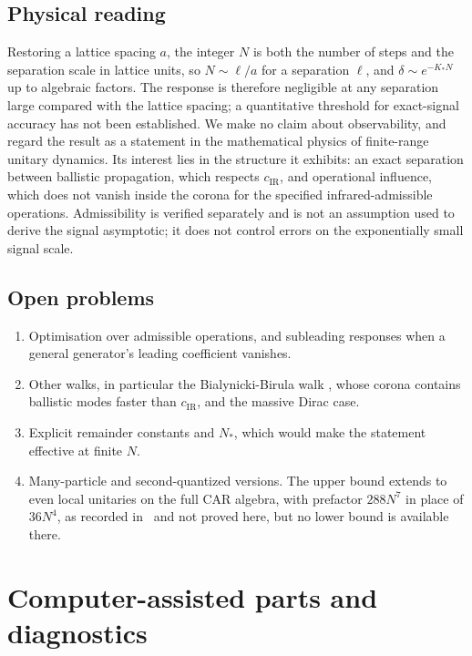 \documentclass[11pt]{amsart}
\theoremstyle{definition}
\theoremstyle{remark}
\newcommand{\cIR}{c_{\mathrm{IR}}}
\begin{document}
\subsection{Physical reading}
Restoring a lattice spacing $a$, the integer $N$ is both the number of
steps and the separation scale in lattice units, so $N\sim\ell/a$ for a
separation $\ell$, and $\delta\sim e^{-K_*N}$ up to algebraic factors.  The
response is therefore negligible at any separation large compared with the
lattice spacing; a quantitative threshold for exact-signal accuracy has not been established.  We make no claim about observability, and
regard the result as a statement in the mathematical physics of finite-range
unitary dynamics.
Its interest lies in the structure it exhibits: an exact separation between
ballistic propagation, which respects $\cIR$, and operational influence,
which does not vanish inside the corona for the specified
infrared-admissible operations. Admissibility is verified separately and
is not an assumption used to derive the signal asymptotic; it does not
control errors on the exponentially small signal scale.

\subsection{Open problems}
\begin{enumerate}[label=(\arabic*)]
\item Optimisation over admissible operations, and subleading responses
  when a general generator's leading coefficient vanishes.
\item Other walks, in particular the Bialynicki-Birula walk
  \cite[Eq.~(5.12)]{CJWW}, whose corona contains ballistic modes faster than
  $\cIR$, and the massive Dirac case.
\item Explicit remainder constants and $N_*$, which would make the
  statement effective at finite $N$.
\item Many-particle and second-quantized versions.  The upper bound
  extends to even local unitaries on the full CAR algebra, with prefactor
  $288N^7$ in place of $36N^4$, as recorded in~\cite{Repo} and not proved
  here, but no lower bound is available there.
\end{enumerate}

\appendix

\section{Computer-assisted parts and diagnostics}\label{app:numerics}
\end{document}
